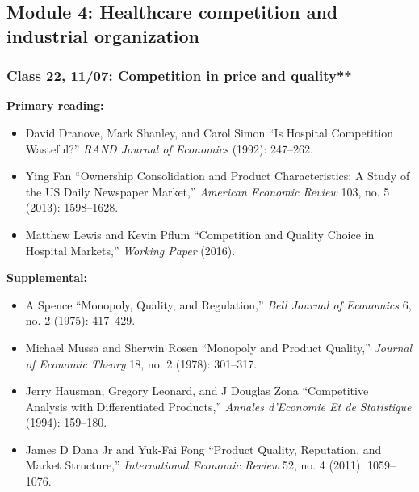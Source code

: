 \documentclass[11pt,]{article}
\providecommand{\tightlist}{%
  \setlength{\itemsep}{0pt}\setlength{\parskip}{0pt}}
\begin{document}
\hypertarget{module-4-healthcare-competition-and-industrial-organization}{%
\subsection{Module 4: Healthcare competition and industrial
organization}\label{module-4-healthcare-competition-and-industrial-organization}}

\hypertarget{class-22-1107-competition-in-price-and-quality}{%
\subsubsection{Class 22, 11/07: Competition in price and
quality**}\label{class-22-1107-competition-in-price-and-quality}}

\textbf{Primary reading:}

\begin{itemize}
\tightlist
\item
  David Dranove, Mark Shanley, and Carol Simon {``Is Hospital
  Competition Wasteful?''} \emph{RAND Journal of Economics} (1992):
  247--262.
\item
  Ying Fan {``Ownership Consolidation and Product Characteristics: {A}
  Study of the {US} Daily Newspaper Market,''} \emph{American Economic
  Review} 103, no. 5 (2013): 1598--1628.
\item
  Matthew Lewis and Kevin Pflum {``Competition and {Quality} {Choice} in
  {Hospital} {Markets},''} \emph{Working Paper} (2016).
\end{itemize}

\textbf{Supplemental:}

\begin{itemize}
\tightlist
\item
  A Spence {``Monopoly, {Quality}, and {Regulation},''} \emph{Bell
  Journal of Economics} 6, no. 2 (1975): 417--429.
\item
  Michael Mussa and Sherwin Rosen {``Monopoly and Product Quality,''}
  \emph{Journal of Economic Theory} 18, no. 2 (1978): 301--317.
\item
  Jerry Hausman, Gregory Leonard, and J Douglas Zona {``Competitive
  Analysis with Differentiated Products,''} \emph{Annales d'Economie Et
  de Statistique} (1994): 159--180.
\item
  James D Dana Jr and Yuk-Fai Fong {``Product Quality, Reputation, and
  Market Structure,''} \emph{International Economic Review} 52, no. 4
  (2011): 1059--1076.
\end{itemize}
\end{document}
